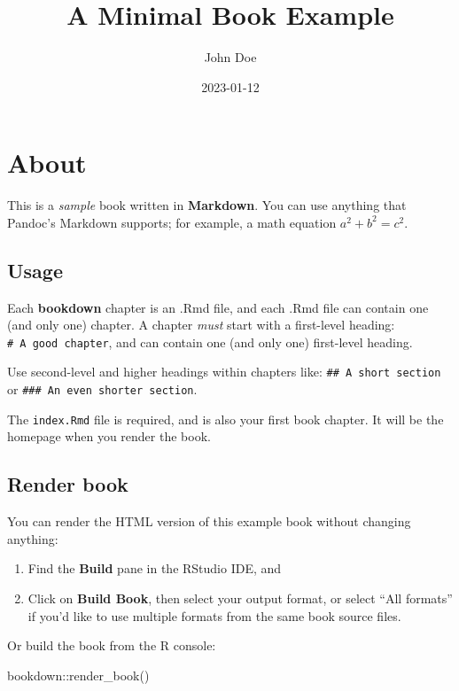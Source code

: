 \documentclass[
]{book}
\title{A Minimal Book Example}
\author{John Doe}
\date{2023-01-12}
\newenvironment{Shaded}{\begin{snugshade}}{\end{snugshade}}
\newcommand{\FunctionTok}[1]{\textcolor[rgb]{0.00,0.00,0.00}{#1}}
\newcommand{\NormalTok}[1]{#1}
\newcommand{\SpecialCharTok}[1]{\textcolor[rgb]{0.00,0.00,0.00}{#1}}
\theoremstyle{definition}
\theoremstyle{definition}
\theoremstyle{definition}
\theoremstyle{definition}
\theoremstyle{remark}
\begin{document}
\maketitle

{
\setcounter{tocdepth}{1}
\tableofcontents
}
\hypertarget{about}{%
\chapter{About}\label{about}}

This is a \emph{sample} book written in \textbf{Markdown}. You can use anything that Pandoc's Markdown supports; for example, a math equation \(a^2 + b^2 = c^2\).

\hypertarget{usage}{%
\section{Usage}\label{usage}}

Each \textbf{bookdown} chapter is an .Rmd file, and each .Rmd file can contain one (and only one) chapter. A chapter \emph{must} start with a first-level heading: \texttt{\#\ A\ good\ chapter}, and can contain one (and only one) first-level heading.

Use second-level and higher headings within chapters like: \texttt{\#\#\ A\ short\ section} or \texttt{\#\#\#\ An\ even\ shorter\ section}.

The \texttt{index.Rmd} file is required, and is also your first book chapter. It will be the homepage when you render the book.

\hypertarget{render-book}{%
\section{Render book}\label{render-book}}

You can render the HTML version of this example book without changing anything:

\begin{enumerate}
\def\labelenumi{\arabic{enumi}.}
\item
  Find the \textbf{Build} pane in the RStudio IDE, and
\item
  Click on \textbf{Build Book}, then select your output format, or select ``All formats'' if you'd like to use multiple formats from the same book source files.
\end{enumerate}

Or build the book from the R console:

\begin{Shaded}
\begin{Highlighting}[]
\NormalTok{bookdown}\SpecialCharTok{::}\FunctionTok{render\_book}\NormalTok{()}
\end{Highlighting}
\end{Shaded}
\end{document}
